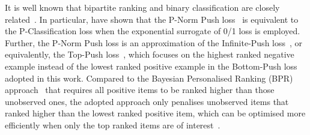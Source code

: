 It is well known
that bipartite ranking and binary classification are
closely related~\cite{ertekin2011equivalence,menon2016bipartite}.
In particular, \citet{ertekin2011equivalence} have shown that the P-Norm Push %
loss~\cite{rudin2009p}
is equivalent to the P-Classification loss when %
the exponential surrogate of 0/1 loss is employed.
Further, the P-Norm Push loss is an approximation of the Infinite-Push loss~\cite{agarwal2011infinite},
or equivalently, the Top-Push loss~\cite{li2014top}, which focuses on the highest ranked negative example instead of
the lowest ranked positive example in the Bottom-Push loss adopted in this work.
%
Compared to the Bayesian Personalised Ranking (BPR) approach~\cite{rendle2009bpr,mcfee2012million} that requires all
positive items to be ranked higher than those unobserved ones, 
the adopted approach only penalises unobserved items that ranked higher than the lowest ranked positive item,
which can be optimised more efficiently 
when only the top ranked items are of interest~\cite{rudin2009p,li2014top}.




